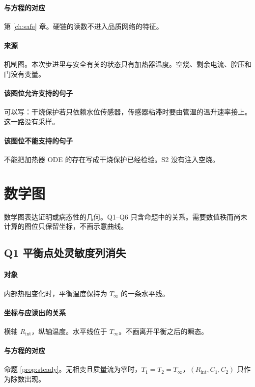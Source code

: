 \paragraph{与方程的对应}
第 \ref{ch:safe} 章。硬链的读数不进入品质网络的特征。

\paragraph{来源}
机制图。本次步进里与安全有关的状态只有加热器温度。空烧、剩余电流、腔压和门没有变量。

\paragraph{该图位允许支持的句子}
可以写：干烧保护若只依赖水位传感器，传感器粘滞时要由管温的温升速率接上。这一路没有采样。

\paragraph{该图位不能支持的句子}
不能把加热器 ODE 的存在写成干烧保护已经检验。S2 没有注入空烧。

\section{数学图}

数学图表达证明或病态性的几何。Q1--Q6 只含命题中的关系。需要数值秩而尚未计算的图位只保留坐标，不画示意曲线。

\subsection{Q1 平衡点处灵敏度列消失}
\paragraph{对象}
内部热阻变化时，平衡温度保持为 $T_\infty$ 的一条水平线。

\paragraph{坐标与应读出的关系}
横轴 $R_{\mathrm{int}}$，纵轴温度。水平线位于 $T_\infty$。不画离开平衡之后的瞬态。

\paragraph{与方程的对应}
命题 \ref{prop:steady}。无相变且质量流为零时，$T_1=T_2=T_\infty$，$(R_{\mathrm{int}},C_1,C_2)$ 只作为除数出现。

